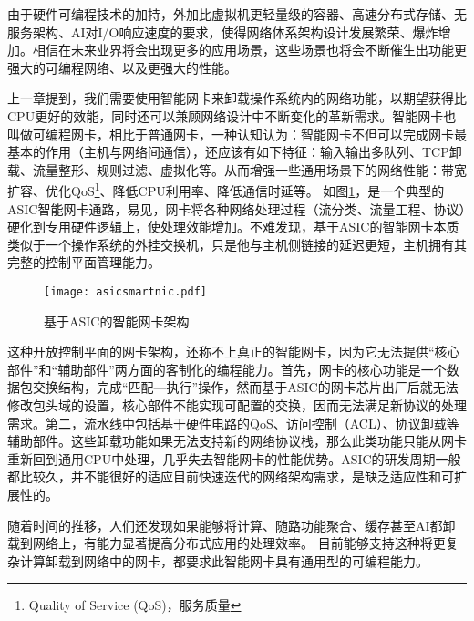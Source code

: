 由于硬件可编程技术的加持，外加比虚拟机更轻量级的容器、高速分布式存储、无服务架构、AI对I/O响应速度的要求，使得网络体系架构设计发展繁荣、爆炸增加。相信在未来业界将会出现更多的应用场景，这些场景也将会不断催生出功能更强大的可编程网络、以及更强大的性能。








上一章提到，我们需要使用智能网卡来卸载操作系统内的网络功能，以期望获得比CPU更好的效能，同时还可以兼顾网络设计中不断变化的革新需求。智能网卡也叫做可编程网卡，相比于普通网卡，一种认知认为：智能网卡不但可以完成网卡最基本的作用（主机与网络间通信），还应该有如下特征：输入输出多队列、TCP卸载、流量整形、规则过滤、虚拟化等。从而增强一些通用场景下的网络性能：带宽扩容、优化QoS\footnote{Quality of Service (QoS)，服务质量}、降低CPU利用率、降低通信时延等。
如图\ref{asicsmartnic}，是一个典型的ASIC智能网卡通路，易见，网卡将各种网络处理过程（流分类、流量工程、协议）硬化到专用硬件逻辑上，使处理效能增加。不难发现，基于ASIC的智能网卡本质类似于一个操作系统的外挂交换机，只是他与主机侧链接的延迟更短，主机拥有其完整的控制平面管理能力。

\begin{figure}[!ht]
	\centering
	\texttt{[image: asicsmartnic.pdf]}
	\caption{基于ASIC的智能网卡架构} \label{asicsmartnic}
\end{figure}

这种开放控制平面的网卡架构，还称不上真正的智能网卡，因为它无法提供“核心部件”和“辅助部件”两方面的客制化的编程能力。首先，网卡的核心功能是一个数据包交换结构，完成“匹配---执行”操作，然而基于ASIC的网卡芯片出厂后就无法修改包头域的设置，核心部件不能实现可配置的交换，因而无法满足新协议的处理需求。第二，流水线中包括基于硬件电路的QoS、访问控制（ACL）、协议卸载等辅助部件。这些卸载功能如果无法支持新的网络协议栈，那么此类功能只能从网卡重新回到通用CPU中处理，几乎失去智能网卡的性能优势。ASIC的研发周期一般都比较久，并不能很好的适应目前快速迭代的网络架构需求，是缺乏适应性和可扩展性的。

随着时间的推移，人们还发现如果能够将计算、随路功能聚合、缓存甚至AI都卸载到网络上，有能力显著提高分布式应用的处理效率。%
目前能够支持这种将更复杂计算卸载到网络中的网卡，都要求此智能网卡具有通用型的可编程能力。

